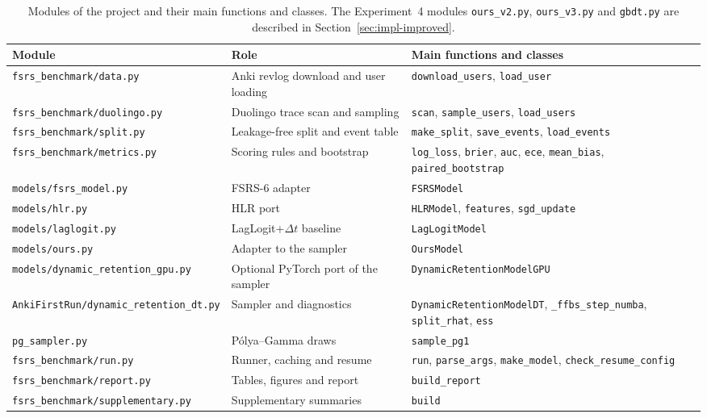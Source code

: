 \begin{table}[htbp]
  \centering
  \footnotesize\setlength{\tabcolsep}{4pt}
  \footnotesize
  \caption{Modules of the project and their main functions and classes. The Experiment~4 modules \texttt{ours\_v2.py}, \texttt{ours\_v3.py} and \texttt{gbdt.py} are described in Section~\ref{sec:impl-improved}.}
  \label{tab:modules}
  \begin{tabular}{@{}>{\raggedright\arraybackslash}p{5.8cm}>{\raggedright\arraybackslash}p{3.4cm}>{\raggedright\arraybackslash}p{5.0cm}@{}}
    \toprule
    \textbf{Module} & \textbf{Role} & \textbf{Main functions and classes}\\
    \midrule
    \texttt{fsrs\_benchmark/\allowbreak data.py} & Anki revlog download and user loading & \texttt{download\_users}, \texttt{load\_user}\\
    \texttt{fsrs\_benchmark/\allowbreak duolingo.py} & Duolingo trace scan and sampling & \texttt{scan}, \texttt{sample\_users}, \texttt{load\_users}\\
    \texttt{fsrs\_benchmark/\allowbreak split.py} & Leakage-free split and event table & \texttt{make\_split}, \texttt{save\_events}, \texttt{load\_events}\\
    \texttt{fsrs\_benchmark/\allowbreak metrics.py} & Scoring rules and bootstrap & \texttt{log\_loss}, \texttt{brier}, \texttt{auc}, \texttt{ece}, \texttt{mean\_bias}, \texttt{paired\_\allowbreak bootstrap}\\
    \texttt{models/fsrs\_model.py} & FSRS-6 adapter & \texttt{FSRSModel}\\
    \texttt{models/hlr.py} & HLR port & \texttt{HLRModel}, \texttt{features}, \texttt{sgd\_update}\\
    \texttt{models/laglogit.py} & LagLogit+$\Delta t$ baseline & \texttt{LagLogitModel}\\
    \texttt{models/ours.py} & Adapter to the sampler & \texttt{OursModel}\\
    \texttt{models/\allowbreak dynamic\_retention\_gpu.py} & Optional PyTorch port of the sampler & \texttt{DynamicRetentionModel\allowbreak GPU}\\
    \texttt{AnkiFirstRun/\allowbreak dynamic\_retention\_dt.py} & Sampler and diagnostics & \texttt{DynamicRetentionModel\allowbreak DT}, \texttt{\_ffbs\_step\_numba}, \texttt{split\_rhat}, \texttt{ess}\\
    \texttt{pg\_sampler.py} & P\'olya--Gamma draws & \texttt{sample\_pg1}\\
    \texttt{fsrs\_benchmark/\allowbreak run.py} & Runner, caching and resume & \texttt{run}, \texttt{parse\_args}, \texttt{make\_model}, \texttt{check\_\allowbreak resume\_\allowbreak config}\\
    \texttt{fsrs\_benchmark/\allowbreak report.py} & Tables, figures and report & \texttt{build\_report}\\
    \texttt{fsrs\_benchmark/\allowbreak supplementary.py} & Supplementary summaries & \texttt{build}\\
    \bottomrule
  \end{tabular}
\end{table}


